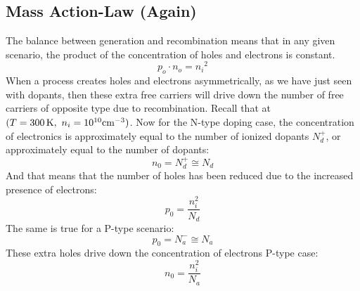 \subsection{Mass Action-Law (Again)}
The balance between generation and recombination means that in any given scenario, the product of the concentration of holes and electrons is constant.  
    \begin{equation}
        {p_o} \cdot {n_o} = {n_i}^2
    \end{equation} 
When a process creates holes and electrons asymmetrically, as we have just seen with dopants, then these extra free carriers will drive down the number of free carriers of opposite type due to recombination.   Recall that at $(T = 300\,{\rm{K}},\,\,{n_i} = {10^{10}}{\rm{c}}{{\rm{m}}^{ - 3}})$.  Now for the N-type doping case, the concentration of electronics is approximately equal to the number of ionized dopants $N_d^+$, or approximately equal to the number of dopants:
    \begin{equation}
        {n_0} = N_d^+  \cong {N_d}
    \end{equation}
And that means that the number of holes has been reduced due to the increased presence of electrons:
    \begin{equation}
        p_0 = \frac{n_i^2}{N_d}
    \end{equation}
The same is true for a P-type scenario:
    \begin{equation}
        {p_0} = N_a^ -  \cong {N_a} 
    \end{equation}
These extra holes drive down the concentration of electrons 
{ P-type case:}
    \begin{equation}
        n_0 = \frac{n_i^2}{N_a}
    \end{equation}
